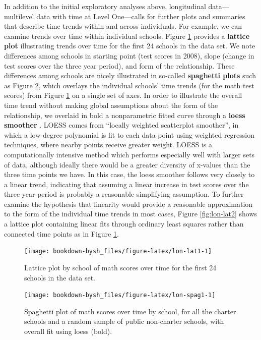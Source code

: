 \documentclass[
]{krantz}
\begin{document}
In addition to the initial exploratory analyses above, longitudinal data---multilevel data with time at Level One---calls for further plots and summaries that describe time trends within and across individuals. For example, we can examine trends over time within individual schools. Figure \ref{fig:lon-lat1} provides a \textbf{lattice plot}  illustrating trends over time for the first 24 schools in the data set. We note differences among schools in starting point (test scores in 2008), slope (change in test scores over the three year period), and form of the relationship. These differences among schools are nicely illustrated in so-called \textbf{spaghetti plots}  such as Figure \ref{fig:lon-spag1}, which overlays the individual schools' time trends (for the math test scores) from Figure \ref{fig:lon-lat1} on a single set of axes. In order to illustrate the overall time trend without making global assumptions about the form of the relationship, we overlaid in bold a nonparametric fitted curve through a \textbf{loess smoother} . LOESS comes from ``locally weighted scatterplot smoother'', in which a low-degree polynomial is fit to each data point using weighted regression techniques, where nearby points receive greater weight. LOESS is a computationally intensive method which performs especially well with larger sets of data, although ideally there would be a greater diversity of x-values than the three time points we have. In this case, the loess smoother follows very closely to a linear trend, indicating that assuming a linear increase in test scores over the three year period is probably a reasonable simplifying assumption. To further examine the hypothesis that linearity would provide a reasonable approximation to the form of the individual time trends in most cases, Figure \ref{fig:lon-lat2} shows a lattice plot containing linear fits through ordinary least squares rather than connected time points as in Figure \ref{fig:lon-lat1}.

\begin{figure}

{\centering \texttt{[image: bookdown-bysh\_files/figure-latex/lon-lat1-1]} 

}

\caption{Lattice plot by school of math scores over time for the first 24 schools in the data set.}\label{fig:lon-lat1}
\end{figure}

\begin{figure}

{\centering \texttt{[image: bookdown-bysh\_files/figure-latex/lon-spag1-1]} 

}

\caption{ Spaghetti plot of math scores over time by school, for all the charter schools and a random sample of public non-charter schools, with overall fit using loess (bold).}\label{fig:lon-spag1}
\end{figure}
\end{document}
